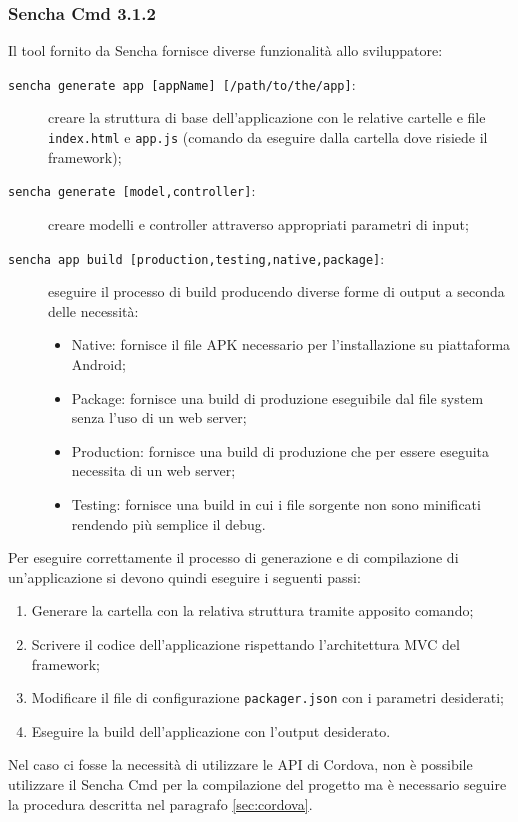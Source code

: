 \subsubsection{Sencha Cmd 3.1.2}
Il tool fornito da Sencha fornisce diverse funzionalità allo sviluppatore:
\begin{description}
\item[\texttt{sencha generate app [appName] [/path/to/the/app]}:] creare la struttura di base dell'applicazione con le relative cartelle e file \texttt{index.html} e \texttt{app.js} (comando da eseguire dalla cartella dove risiede il framework);
\item[\texttt{sencha generate [model,controller]}:] creare modelli e controller attraverso appropriati parametri di input;
\item[\texttt{sencha app build [production,testing,native,package]}:] eseguire il processo di build producendo diverse forme di output a seconda delle necessità:
	\begin{itemize}
	\item Native: fornisce il file APK necessario per l'installazione su piattaforma Android;
	\item Package: fornisce una build di produzione eseguibile dal file system senza l'uso di un web server;
	\item Production: fornisce una build di produzione che per essere eseguita necessita di un web server;
	\item Testing: fornisce una build in cui i file sorgente non sono minificati rendendo più semplice il debug.
	\end{itemize}
\end{description}

Per eseguire correttamente il processo di generazione e di compilazione di un'applicazione si devono quindi eseguire i seguenti passi:
\begin{enumerate}
\item Generare la cartella con la relativa struttura tramite apposito comando;
\item Scrivere il codice dell'applicazione rispettando l'architettura MVC del framework;
\item Modificare il file di configurazione \texttt{packager.json} con i parametri desiderati;
\item Eseguire la build dell'applicazione con l'output desiderato.
\end{enumerate}

Nel caso ci fosse la necessità di utilizzare le API di Cordova, non è possibile utilizzare il Sencha Cmd per la compilazione del progetto ma è necessario seguire la procedura descritta nel paragrafo \ref{sec:cordova}.

